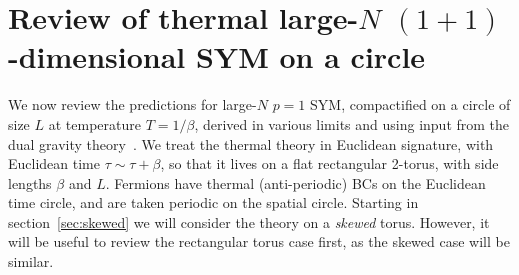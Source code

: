 \section{\label{sec:gravity}Review of thermal large-$N$ $(1 + 1)$-dimensional SYM on a circle}
We now review the predictions for large-$N$ $p = 1$ SYM, compactified on a circle of size $L$ at temperature $T = 1 / \beta$, derived in various limits and using input from the dual gravity theory~\cite{Itzhaki:1998dd, Li:1998jy, Martinec:1998ja, Aharony:2004ig, Aharony:2005ew, Mandal:2011hb}.
We treat the thermal theory in Euclidean signature, with Euclidean time $\tau \sim \tau + \beta$, so that it lives on a flat rectangular 2-torus, with side lengths $\beta$ and $L$.
Fermions have thermal (anti-periodic) BCs on the Euclidean time circle, and are taken periodic on the spatial circle.
Starting in section~\ref{sec:skewed} we will consider the theory on a \emph{skewed} torus.
However, it will be useful to review the rectangular torus case first, as the skewed case will be similar.

